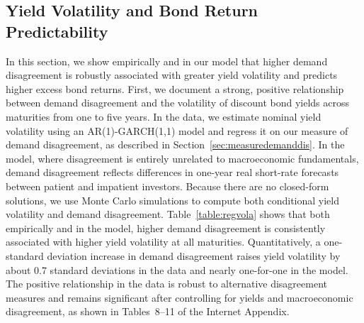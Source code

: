 \documentclass[preprint,11pt,authoryear]{elsarticle}
\theoremstyle{plain}
\begin{document}
  



\subsection{Yield Volatility and Bond Return Predictability}\label{sec:YieldVolaANDPredictability}

In this section, we show empirically and in our model that higher demand disagreement is robustly associated with greater yield volatility and predicts higher excess bond returns. First, we document a strong, positive relationship between demand disagreement and the volatility of discount bond yields across maturities from one to five years. In the data, we estimate nominal yield volatility using an AR(1)-GARCH(1,1) model and regress it on our measure of demand disagreement, as described in Section~\ref{sec:measuredemanddis}. In the model, where disagreement is entirely unrelated to macroeconomic fundamentals, demand disagreement reflects differences in one-year real short-rate forecasts between patient and impatient investors. Because there are no closed-form solutions, we use Monte Carlo simulations to compute both conditional yield volatility and demand disagreement. Table~\ref{table:regvola} shows that both empirically and in the model, higher demand disagreement is consistently associated with higher yield volatility at all maturities. Quantitatively, a one-standard deviation increase in demand disagreement raises yield volatility by about 0.7 standard deviations in the data and nearly one-for-one in the model. The positive relationship in the data is robust to alternative disagreement measures and remains significant after controlling for yields and macroeconomic disagreement, as shown in Tables~8–11 of the Internet Appendix.
\end{document}
